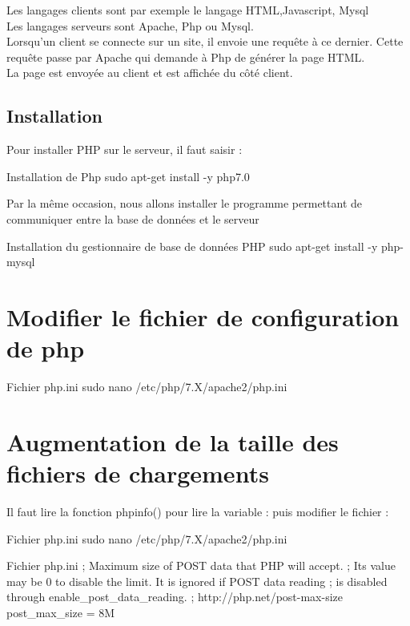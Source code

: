 {Les langages clients sont par exemple le langage HTML,Javascript, Mysql \\
Les langages serveurs sont Apache, Php ou Mysql. \\

Lorsqu’un client se connecte sur un site, il envoie une requête à ce dernier. Cette requête passe par Apache qui demande à Php de générer la page HTML. \\
La page est envoyée au client et est affichée du côté client. \\


\subsection{Installation}
Pour installer PHP sur le serveur, il faut saisir :

\begin{Bash}{Installation de Php}
sudo apt-get install -y php7.0
\end{Bash}

Par la même occasion, nous allons installer le programme permettant de communiquer entre la base de données et le serveur

\begin{Bash}{Installation du gestionnaire de base de données PHP}
sudo apt-get install -y php-mysql
\end{Bash}


\section{Modifier le fichier de configuration de php}
\begin{Bash}{Fichier php.ini}
sudo nano /etc/php/7.X/apache2/php.ini
\end{Bash}



\section{Augmentation de la taille des fichiers de chargements}

Il faut lire la fonction phpinfo() pour lire la variable :
puis modifier le fichier :

\begin{Bash}{Fichier php.ini}
sudo nano /etc/php/7.X/apache2/php.ini
\end{Bash}


\begin{Bash}{Fichier php.ini}
; Maximum size of POST data that PHP will accept.
; Its value may be 0 to disable the limit. It is ignored if POST data reading
; is disabled through enable_post_data_reading.
; http://php.net/post-max-size
post_max_size = 8M
\end{Bash}

}

